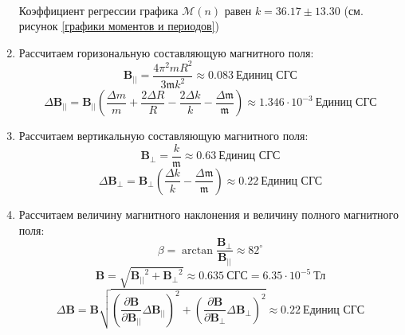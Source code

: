 \documentclass[a4paper, 12pt]{article}
\begin{document}
\begin{enumerate}
\begin{table}[htbp]
        \label{дополнительный груз для магнитной стрелки}
    \end{table}\\
    Коэффициент регрессии графика $\mathcal{M}(n)$ равен $k = 36.17\pm 13.30$ (см. рисунок \ref{графики моментов и периодов})
    \item Рассчитаем горизональную составляющую магнитного поля:
    \begin{equation*}
        \mathbf{B_{||}} = \frac{4\pi^{2} mR^{2}}{3\mathfrak{m}k^{2}} \approx 0.083\ \text{Единиц СГС}
    \end{equation*}
    \begin{equation*}
        \Delta \mathbf{B_{||}} = \mathbf{B_{||}}\left(\frac{\Delta m}{m} + \frac{2\Delta R}{R} - \frac{2\Delta k}{k} - \frac{\Delta \mathfrak{m}}{\mathfrak{m}}\right) \approx 1.346 \cdot10^{-3}\ \text{Единиц СГС}
    \end{equation*}
    \item Рассчитаем вертикальную составляющую магнитного поля:
    \begin{equation*}
        \mathbf{B_{\perp}} = \frac{k}{\mathfrak{m}} \approx 0.63\ \text{Единиц СГС}
    \end{equation*}
    \begin{equation*}
        \Delta \mathbf{B_{\perp}} = \mathbf{B_{\perp}}\left(\frac{\Delta k}{k} - \frac{\Delta \mathfrak{m}}{\mathfrak{m}}\right) \approx 0.22\ \text{Единиц СГС}
    \end{equation*}
    \item Рассчитаем величину магнитного наклонения и величину полного магнитного поля:
    \begin{equation*}
            \beta = \arctan{\frac{\mathbf{B_{\perp}}}{\mathbf{B_{||}}}} \approx 82^\circ
    \end{equation*}
    \begin{equation*}
        \mathbf{B} = \sqrt{\mathbf{B_{||}}^{2} + \mathbf{B_{\perp}}^{2}} \approx 0.635\ \text{СГС} = 6.35\cdot 10^{-5}\ \text{Тл}
    \end{equation*}
    \begin{equation*}
        \Delta \mathbf{B} = \mathbf{B}\sqrt{\left(\frac{\partial \mathbf{B}}{\partial \mathbf{B_{||}}}\Delta \mathbf{B_{||}}\right)^{2} + \left(\frac{\partial \mathbf{B}}{\partial \mathbf{B_{\perp}}}\Delta \mathbf{B_{\perp}}\right)^{2}} \approx 0.22\ \text{Единиц СГС}
    \end{equation*}
    \begin{figure}[htbp]
        \centering

\end{figure}
\end{enumerate}
\end{document}
